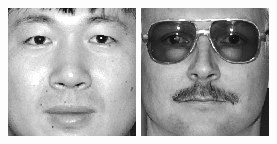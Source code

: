 \begin{figure}[ht]
\begin{center}
  \includegraphics[width=\columnwidth/10]{ch5/figures/feret29.jpg}
  \includegraphics[width=\columnwidth/10]{ch5/figures/feret30.jpg}\\

\end{center}
\end{figure}

